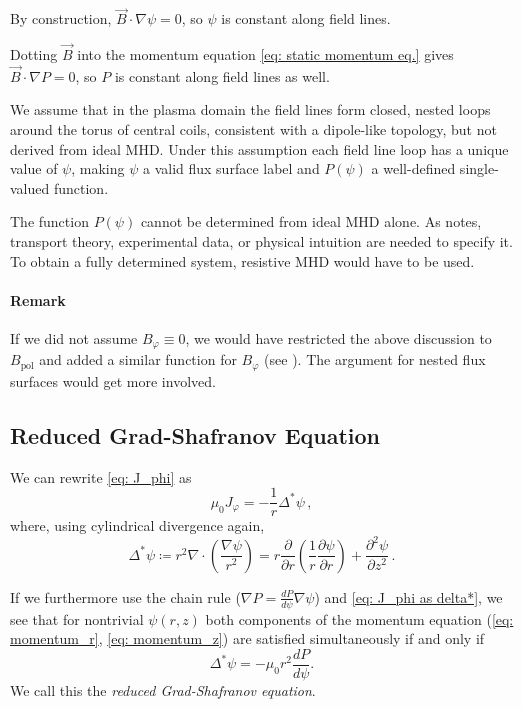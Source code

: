 By construction, $\vec{B} \cdot \nabla\psi = 0$, so $\psi$ is constant
along field lines.

Dotting $\vec{B}$ into the momentum equation \eqref{eq: static momentum eq.}
gives $\vec{B} \cdot \nabla P = 0$, so $P$ is constant along field lines as well.

We assume that in the plasma domain the field lines form closed, nested loops
around the torus of central coils, consistent with a dipole-like topology, but not
derived from ideal MHD. Under this assumption each field line loop
has a unique value of $\psi$, making $\psi$ a valid flux surface label
and $P(\psi)$ a well-defined single-valued function.

The function $P(\psi)$ cannot be determined from ideal MHD alone. As
\cite{Freidberg2014} notes, transport theory, experimental data, or physical
intuition are needed to specify it. To obtain a fully determined system,
resistive MHD would have to be used.


\paragraph{Remark} If we did not assume $B_\varphi \equiv 0$, we would have restricted 
the above discussion to $B_\text{pol}$ and added a similar function for $B_\varphi$ 
(see \cite{Freidberg2014}). The argument for nested flux surfaces would get more involved.



\subsection{Reduced Grad-Shafranov Equation}

We can rewrite \eqref{eq: J_phi} as
\begin{equation}
    \mu_0 J_\varphi = - \frac{1}{r} \Delta^* \psi  \, ,
    \label{eq: J_phi as delta*}
\end{equation}
where, using cylindrical divergence again, 
\begin{equation*}
    \Delta^* \psi \coloneq r^2 \nabla \cdot \left(\frac{\nabla \psi}{r^2}\right) = r \frac{\partial}{\partial r}\left(\frac{1}{r}\frac{\partial \psi}{\partial r}\right) + \frac{\partial^2 \psi}{\partial z^2}  \, .
\end{equation*}

If we furthermore use the chain rule ($\nabla P = \frac{dP}{d\psi} \nabla \psi$) and \eqref{eq: J_phi as delta*}, 
we see that for nontrivial $\psi(r,z)$ both components of the momentum equation (\eqref{eq: momentum_r}, \eqref{eq: momentum_z})
are satisfied simultaneously if and only if 
\begin{equation}
    \label{eq: reduced grad-shafranov eq}
    \Delta^*\psi = - \mu_0 r^2 \frac{dP}{d\psi}.
\end{equation}
We call this the \emph{reduced Grad-Shafranov equation}. 

